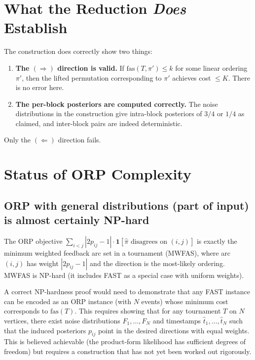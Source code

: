 \documentclass[11pt]{article}
\begin{document}
\section{What the Reduction \emph{Does} Establish}

The construction does correctly show two things:

\begin{enumerate}
\item \textbf{The $(\Rightarrow)$ direction is valid.}  If $\mathrm{fas}(T, \pi') \le
  k$ for some linear ordering $\pi'$, then the lifted permutation corresponding to
  $\pi'$ achieves cost $\le K$.  There is no error here.

\item \textbf{The per-block posteriors are computed correctly.}  The noise
  distributions in the construction give intra-block posteriors of $3/4$ or $1/4$
  as claimed, and inter-block pairs are indeed deterministic.
\end{enumerate}

Only the $(\Leftarrow)$ direction fails.

\section{Status of ORP Complexity}

\subsection{ORP with general distributions (part of input) is almost certainly NP-hard}

The ORP objective $\sum_{i<j} |2p_{ij}-1| \cdot \mathbf{1}[\hat\pi \text{ disagrees
on } (i,j)]$ is exactly the minimum weighted feedback arc set in a tournament
(MWFAS), where arc $(i,j)$ has weight $|2p_{ij}-1|$ and the direction is the
most-likely ordering.  MWFAS is NP-hard (it includes FAST as a special case with
uniform weights).

A correct NP-hardness proof would need to demonstrate that any FAST instance can be
encoded as an ORP instance (with $N$ events) whose minimum cost corresponds to
$\mathrm{fas}(T)$.  This requires showing that for any tournament $T$ on $N$ vertices,
there exist noise distributions $F_1, \ldots, F_N$ and timestamps $\hat{t}_1, \ldots,
\hat{t}_N$ such that the induced posteriors $p_{ij}$ point in the desired directions
with equal weights.  This is believed achievable (the product-form likelihood has
sufficient degrees of freedom) but requires a construction that has not yet been
worked out rigorously.
\end{document}
